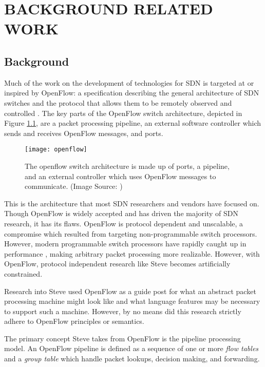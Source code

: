 \chapter{BACKGROUND RELATED WORK}
\label{ch:related}

\section{Background}
\label{rel:openflow}

Much of the work on the development of technologies for SDN is targeted at or 
inspired by OpenFlow: a specification describing the general architecture of SDN 
switches and the protocol that allows them to be remotely observed and controlled 
\cite{openflow_spec}. 
The key parts of the OpenFlow switch architecture, depicted in Figure \ref{fg:openflow_switch}, are a packet 
processing pipeline, an external software controller which sends and receives
OpenFlow messages, and ports. 

\begin{figure}[ht]
\centering
\texttt{[image: openflow]}
\caption{The openflow switch architecture is made up of ports, a pipeline,
and an external controller which uses OpenFlow messages to communicate. (Image Source: \cite{openflow_spec})}
\label{fg:openflow_switch}
\end{figure}

This is the architecture that most SDN researchers and vendors have focused on.
Though OpenFlow is widely accepted and has driven the majority of SDN research,
it has its flaws.
OpenFlow is protocol dependent and unscalable, a compromise which resulted from targeting non-programmable switch processors. However, modern programmable switch processors have rapidly caught up in performance \cite{bosshart2013forwarding}, making arbitrary packet processing more realizable. However, with OpenFlow, protocol independent research like Steve becomes artificially constrained.

Research into Steve used OpenFlow as a guide post for what an abstract
packet processing machine might look like and what language features may be
necessary to support such a machine. However, by no means did this research
strictly adhere to OpenFlow principles or semantics.

The primary concept Steve takes from OpenFlow is the pipeline processing model.
An OpenFlow pipeline is defined as a sequence
of one or more \textit{flow tables} and a \textit{group table} which handle
packet lookups, decision making, and forwarding.

